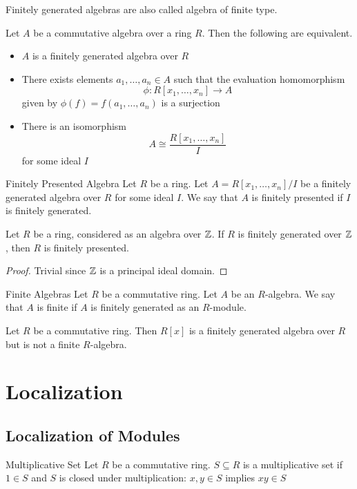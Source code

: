 \documentclass[a4paper]{article}
\begin{document}
Finitely generated algebras are also called algebra of finite type. 

\begin{thm}{}{} Let $A$ be a commutative algebra over a ring $R$. Then the following are equivalent. 
\begin{itemize}
\item $A$ is a finitely generated algebra over $R$
\item There exists elements $a_1,\dots,a_n\in A$ such that the evaluation homomorphism $$\phi:R[x_1,\dots,x_n]\to A$$ given by $\phi(f)=f(a_1,\dots,a_n)$ is a surjection
\item There is an isomorphism $$A\cong\frac{R[x_1,\dots,x_n]}{I}$$ for some ideal $I$
\end{itemize}
\end{thm}

\begin{defn}{Finitely Presented Algebra}{} Let $R$ be a ring. Let $A=R[x_1,\dots,x_n]/I$ be a finitely generated algebra over $R$ for some ideal $I$. We say that $A$ is finitely presented if $I$ is finitely generated. 
\end{defn}

\begin{lmm}{}{} Let $R$ be a ring, considered as an algebra over $\mathbb{Z}$. If $R$ is finitely generated over $\mathbb{Z}$, then $R$ is finitely presented. 
\begin{proof}
Trivial since $\mathbb{Z}$ is a principal ideal domain. 
\end{proof}
\end{lmm}

\begin{defn}{Finite Algebras}{} Let $R$ be a commutative ring. Let $A$ be an $R$-algebra. We say that $A$ is finite if $A$ is finitely generated as an $R$-module. 
\end{defn}

\begin{eg}{}{} Let $R$ be a commutative ring. Then $R[x]$ is a finitely generated algebra over $R$ but is not a finite $R$-algebra. 
\end{eg}

\pagebreak
\section{Localization}
\subsection{Localization of Modules}
\begin{defn}{Multiplicative Set}{} Let $R$ be a commutative ring. $S\subseteq R$ is a multiplicative set if $1\in S$ and $S$ is closed under multiplication: $x,y\in S$ implies $xy\in S$
\end{defn}
\end{document}
